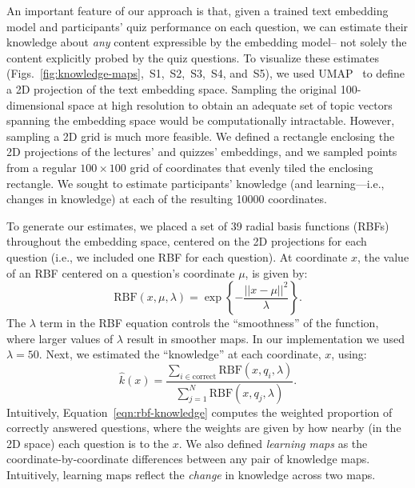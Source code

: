 \documentclass[10pt]{article}
\newcommand{\individualKnowledgeMapsA}{S1}
\newcommand{\individualKnowledgeMapsB}{S2}
\newcommand{\individualKnowledgeMapsC}{S3}
\newcommand{\individualLearningMapsA}{S4}
\newcommand{\individualLearningMapsB}{S5}
\begin{document}
An important feature of our approach is that, given a trained text embedding
model and participants' quiz performance on each question, we can estimate
their knowledge about \textit{any} content expressible by the embedding model--
not solely the content explicitly probed by the quiz questions. To visualize
these estimates
(Figs.~\ref{fig:knowledge-maps},~\individualKnowledgeMapsA,~\individualKnowledgeMapsB,~\individualKnowledgeMapsC,~\individualLearningMapsA,
and~\individualLearningMapsB), we used UMAP~\citep{McInEtal18a} to define a 2D
projection of the text embedding space. Sampling the original 100-dimensional
space at high resolution to obtain an adequate set of topic vectors spanning
the embedding space would be computationally intractable. However, sampling a
2D grid is much more feasible. We defined a rectangle enclosing the 2D
projections of the lectures' and quizzes' embeddings, and we sampled points
from a regular $100 \times 100$ grid of coordinates that evenly tiled the
enclosing rectangle. We sought to estimate participants' knowledge (and
learning---i.e., changes in knowledge) at each of the resulting 10000
coordinates.

To generate our estimates, we placed a set of 39 radial basis functions (RBFs)
throughout the embedding space, centered on the 2D projections for each
question (i.e., we included one RBF for each question). At coordinate $x$, the
value of an RBF centered on a question's coordinate $\mu$, is given by:
\begin{equation}
    \mathrm{RBF}(x, \mu, \lambda) = \exp\left\{-\frac{||x - \mu||^2}{\lambda}\right\}.
    \label{eqn:rbf}
\end{equation}
The $\lambda$ term in the RBF equation controls the ``smoothness'' of the
function, where larger values of $\lambda$ result in smoother maps. In our
implementation we used $\lambda = 50$.  Next, we estimated the ``knowledge''
at each coordinate, $x$, using:
\begin{equation}
    \hat{k}(x) = \frac{\sum_{i \in \mathrm{correct}} \mathrm{RBF}(x, q_i, \lambda)}{\sum_{j = 1}^N \mathrm{RBF}(x, q_j, \lambda)}.
    \label{eqn:rbf-knowledge}
\end{equation}
Intuitively, Equation~\ref{eqn:rbf-knowledge} computes the weighted proportion of
correctly answered questions, where the weights are given by how nearby (in the 2D space)
each question is to the $x$.  We also defined \textit{learning maps} as the coordinate-by-coordinate
differences between any pair of knowledge maps.  Intuitively, learning maps reflect the \textit{change}
in knowledge across two maps.
\end{document}
